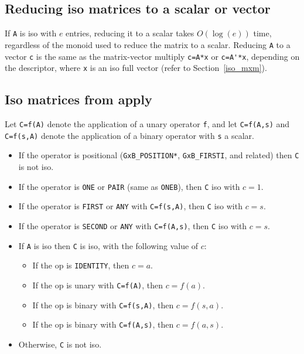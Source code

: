 \documentclass[12pt]{article}
\begin{document}
\subsection{Reducing iso matrices to a scalar or vector}
\label{iso_reduce}

If \verb'A' is iso with $e$ entries, reducing it to a scalar takes $O(\log(e))$
time, regardless of the monoid used to reduce the matrix to a scalar.  Reducing
\verb'A' to a vector \verb'c' is the same as the matrix-vector multiply
\verb"c=A*x" or \verb"c=A'*x", depending on the descriptor, where \verb'x'
is an iso full vector (refer to Section~\ref{iso_mxm}).

\subsection{Iso matrices from apply}
\label{iso_apply}

Let \verb'C=f(A)' denote the application of a unary operator \verb'f',
and let \verb'C=f(A,s)' and \verb'C=f(s,A)' denote the application of a binary
operator with \verb's' a scalar.

    \begin{itemize}
    \item If the operator is positional (\verb'GxB_POSITION*',
    \verb'GxB_FIRSTI', and related) then \verb'C' is not iso.

    \item If the operator is \verb'ONE' or \verb'PAIR' (same as \verb'ONEB'),
        then \verb'C' iso with $c=1$.

    \item If the operator is \verb'FIRST' or \verb'ANY' with \verb'C=f(s,A)',
        then \verb'C' iso with $c=s$.

    \item If the operator is \verb'SECOND' or \verb'ANY' with \verb'C=f(A,s)',
        then \verb'C' iso with $c=s$.

    \item If \verb'A' is iso then \verb'C' is iso, with the following value
        of $c$:

        \begin{itemize}
        \item If the op is \verb'IDENTITY', then $c=a$.
        \item If the op is unary with \verb'C=f(A)', then $c=f(a)$.
        \item If the op is binary with \verb'C=f(s,A)', then $c=f(s,a)$.
        \item If the op is binary with \verb'C=f(A,s)', then $c=f(a,s)$.
        \end{itemize}


    \item Otherwise, \verb'C' is not iso.
    \end{itemize}
\end{document}
